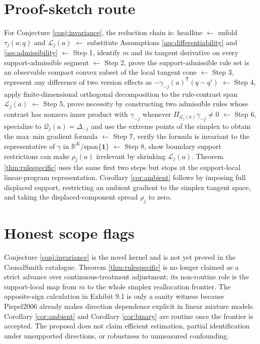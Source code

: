\documentclass[11pt]{article}
\newcommand{\one}{\mathbf{1}}
\newcommand{\transpose}{\mathsf{T}}
\newcommand{\R}{\mathbb{R}}
\theoremstyle{definition}
\theoremstyle{plain}
\theoremstyle{remark}
\begin{document}
\section{Proof-sketch route}
For Conjecture \ref{conj:invariance}, the reduction chain is: headline \(\leftarrow\) unfold \(\tau_j(a;q)\) and \(\mathcal{L}_j(a)\) \(\leftarrow\) substitute Assumptions \ref{ass:differentiability} and \ref{ass:admissibility} \(\leftarrow\) Step 1, identify \(m\) and its tangent derivative on every support-admissible segment \(\leftarrow\) Step 2, prove the support-admissible rule set is an observable compact convex subset of the local tangent cone \(\leftarrow\) Step 3, represent any difference of two version effects as \(-\gamma_{-j}(a)^\transpose(q-q')\) \(\leftarrow\) Step 4, apply finite-dimensional orthogonal decomposition to the rule-contrast span \(\mathcal{L}_j(a)\) \(\leftarrow\) Step 5, prove necessity by constructing two admissible rules whose contrast has nonzero inner product with \(\gamma_{-j}\) whenever \(\Pi_{\mathcal{L}_j(a)}\gamma_{-j}\neq0\) \(\leftarrow\) Step 6, specialize to \(\mathcal{Q}_j(a)=\Delta_{-j}\) and use the extreme points of the simplex to obtain the max--min gradient formula \(\leftarrow\) Step 7, verify the formula is invariant to the representative of \(\gamma\) in \(\R^K/\mathrm{span}\{\one\}\) \(\leftarrow\) Step 8, show boundary support restrictions can make \(\rho_j(a)\) irrelevant by shrinking \(\mathcal{L}_j(a)\). Theorem \ref{thm:rulespecific} uses the same first two steps but stops at the support-local linear-program representation. Corollary \ref{cor:ambient} follows by imposing full displaced support, restricting an ambient gradient to the simplex tangent space, and taking the displaced-component spread \(\rho_j\) to zero.

\section{Honest scope flags}
Conjecture \ref{conj:invariance} is the novel kernel and is not yet proved in the CausalSmith catalogue. Theorem \ref{thm:rulespecific} is no longer claimed as a strict advance over continuous-treatment adjustment; its non-routine role is the support-local map from \(m\) to the whole simplex reallocation frontier. The opposite-sign calculation in Exhibit 9.1 is only a sanity witness because Piepel2006 already makes direction dependence explicit in linear mixture models. Corollary \ref{cor:ambient} and Corollary \ref{cor:binary} are routine once the frontier is accepted. The proposal does not claim efficient estimation, partial identification under unsupported directions, or robustness to unmeasured confounding.
\end{document}
